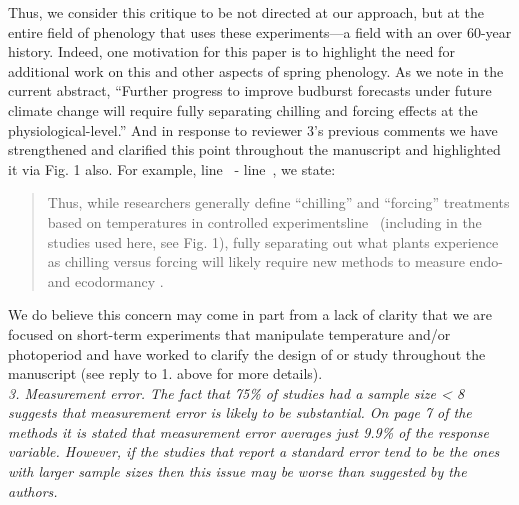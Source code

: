 \documentclass{article}
\newcommand{\lr}[1]{line~\lineref{#1}}
\begin{document}
Thus, we consider this critique to be not directed at our approach, but at the entire field of phenology that uses these experiments---a field with an over 60-year history. Indeed, one motivation for this paper is to highlight the need for additional work on this and other aspects of spring phenology. As we note in the current abstract, ``Further progress to improve budburst forecasts under future climate change will require fully separating chilling and forcing effects at the physiological-level.'' And in response to reviewer 3's previous comments we have strengthened and clarified this point throughout the manuscript and highlighted it via Fig. 1 also. For example, \lr{whatchillstart} - \lr{whatchillend}, we state:
\begin{quote}
Thus, while researchers generally define ``chilling'' and ``forcing'' treatments based on temperatures in controlled experiments\lr{ee7} (including in the studies used here, see Fig. 1), fully separating out what plants experience as chilling versus forcing will likely require new methods to measure endo- and ecodormancy \emph{\citep{vanderschoot2014}}. 
\end{quote}
We do believe this concern may come in part from a lack of clarity that we are focused on short-term experiments that manipulate temperature and/or photoperiod and have worked to clarify the design of or study throughout the manuscript (see reply to 1. above for more details).\\

\emph{3. Measurement error. The fact that 75\% of studies had a sample size < 8 suggests that
measurement error is likely to be substantial. On page 7 of the methods it is stated that
measurement error averages just 9.9\% of the response variable. However, if the studies that
report a standard error tend to be the ones with larger sample sizes then this issue may be
worse than suggested by the authors.}\\
\end{document}

